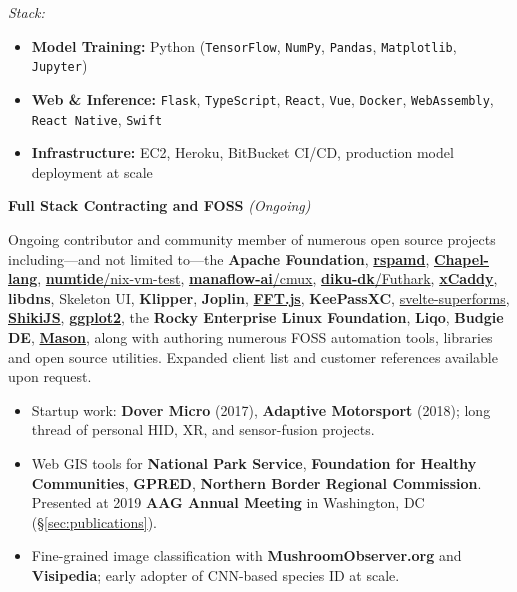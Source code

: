 \documentclass[10pt,letterpaper]{article}
\newcommand{\role}[2]{%
    \noindent\textbf{\color{secondary}#1} \hfill \textit{\color{muted}(#2)}\par\vspace{0.3em}
}
\newcommand{\tech}[1]{\texttt{\small\color{secondary}#1}}
\newcommand{\cvlink}[2]{\href{#1}{\color{linkcolor}#2}}
\begin{document}
\vspace{0.4em}
\noindent\textit{\color{muted}Stack:}
\begin{itemize}
    \item \textbf{Model Training:} Python (\tech{TensorFlow}, \tech{NumPy}, \tech{Pandas}, \tech{Matplotlib}, \tech{Jupyter})
    \item \textbf{Web \& Inference:} \tech{Flask}, \tech{TypeScript}, \tech{React}, \tech{Vue}, \tech{Docker}, \tech{WebAssembly}, \tech{React Native}, \tech{Swift}
    \item \textbf{Infrastructure:} EC2, Heroku, BitBucket CI/CD, production model deployment at scale
\end{itemize}

\vspace{0.4em}

\role{Full Stack Contracting and FOSS}{Ongoing}

Ongoing contributor and community member of numerous open source projects including---and not limited to---the \textbf{Apache Foundation}, \cvlink{https://github.com/rspamd/rspamd/pull/5923}{\textbf{rspamd}}, \cvlink{https://github.com/chapel-lang/mason-registry/pull/77}{\textbf{Chapel-lang}}, \cvlink{https://github.com/numtide/nix-vm-test/pull/172}{\textbf{numtide}/nix-vm-test}, \cvlink{https://github.com/manaflow-ai/cmux/pull/1877}{\textbf{manaflow-ai}/cmux}, \cvlink{https://github.com/diku-dk/futhark/pull/2365}{\textbf{diku-dk}/Futhark}, \cvlink{https://github.com/caddyserver/xcaddy/pull/238}{\textbf{xCaddy}}, \textbf{libdns}, Skeleton UI, \textbf{Klipper}, \textbf{Joplin}, \cvlink{https://github.com/indutny/fft.js}{\textbf{FFT.js}}, \textbf{KeePassXC}, \cvlink{https://github.com/ciscoheat/sveltekit-superforms/pull/678}{svelte-superforms}, \cvlink{https://github.com/shikijs/shiki}{\textbf{ShikiJS}}, \cvlink{https://github.com/tidyverse/ggplot2}{\textbf{ggplot2}}, the \textbf{Rocky Enterprise Linux Foundation}, \textbf{Liqo}, \textbf{Budgie DE}, \cvlink{https://github.com/Jesssullivan/quickchpl}{\textbf{Mason}}, along with authoring numerous FOSS automation tools, libraries and open source utilities. Expanded client list and customer references available upon request.

\begin{itemize}
    \item Startup work: \textbf{Dover Micro} (2017), \textbf{Adaptive Motorsport} (2018); long thread of personal HID, XR, and sensor-fusion projects.
    \item Web GIS tools for \textbf{National Park Service}, \textbf{Foundation for Healthy Communities}, \textbf{GPRED}, \textbf{Northern Border Regional Commission}. Presented at 2019 \textbf{AAG Annual Meeting} in Washington, DC (\S\ref{sec:publications}).
    \item Fine-grained image classification with \textbf{MushroomObserver.org} and \textbf{Visipedia}; early adopter of CNN-based species ID at scale.
\end{itemize}
\end{document}
